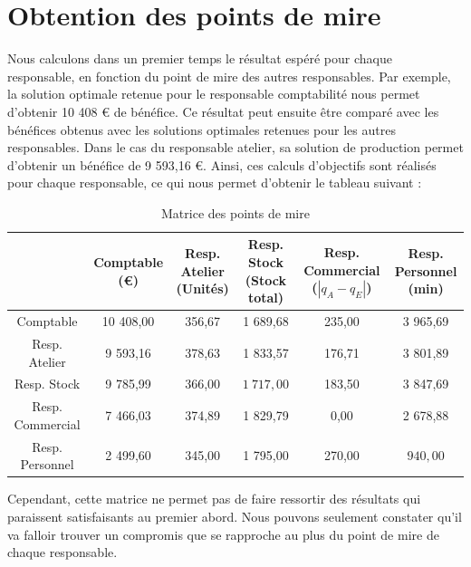 \documentclass[paper=a4, fontsize=11pt]{report}
\numberwithin{equation}{section}		%
\numberwithin{figure}{section}			%
\numberwithin{table}{section}				%
\newcommand\abs[1]{\left|#1\right|}
\begin{document}
\section{Obtention des points de mire}

Nous calculons dans un premier temps le résultat espéré pour chaque responsable, en fonction du point de mire des autres responsables. Par exemple, la solution optimale retenue pour le responsable comptabilité nous permet d'obtenir 10 408 € de bénéfice. Ce résultat peut ensuite être comparé avec les bénéfices obtenus avec les solutions optimales retenues pour les autres responsables. Dans le cas du responsable atelier, sa solution de production permet d'obtenir un bénéfice de 9 593,16 €. Ainsi, ces calculs d'objectifs sont réalisés pour chaque responsable, ce qui nous permet d'obtenir le tableau suivant :

\begin{table}[H]
\begin{center}
\begin{tabular}{c|ccccc}
 & \shortstack{Comptable \\ \scriptsize{(€)}} & \shortstack{Resp. Atelier \\ \scriptsize (Unités)} & \shortstack{Resp. Stock \\ \scriptsize (Stock total)} & \shortstack{Resp. Commercial \\ \scriptsize ($\abs{q_A - q_E}$)} &   \shortstack{Resp. Personnel \\ \scriptsize (min)} \\ 
\hline 
Comptable &  \cellcolor{blue!10} 10 408,00 & 356,67 & 1 689,68 & 235,00 & 3 965,69 \\ 
Resp. Atelier & 9 593,16 & \cellcolor{blue!10}378,63 & 1 833,57 & 176,71 & 3 801,89 \\ 
Resp. Stock & 9 785,99 & 366,00 & \cellcolor{blue!10}$1\:717,00$ & 183,50 & 3 847,69 \\ 
Resp. Commercial & 7 466,03 & 374,89 & 1 829,79 & \cellcolor{blue!10} 0,00 & 2 678,88 \\ 
Resp. Personnel & 2 499,60 & 345,00 & 1 795,00 & 270,00 & \cellcolor{blue!10}$940,00$ \\ 
\end{tabular}
\caption{Matrice des points de mire} 
\end{center}
\end{table}

Cependant, cette matrice ne permet pas de faire ressortir des résultats qui paraissent satisfaisants au premier abord. Nous pouvons seulement constater qu'il va falloir trouver un compromis que se rapproche au plus du point de mire de chaque responsable.
\end{document}
